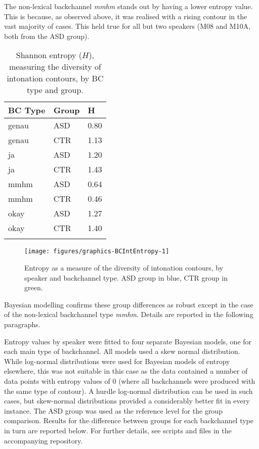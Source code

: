 The non-lexical backchannel \emph{mmhm} stands out by having a lower entropy value. This is because, as observed above, it was realised with a rising contour in the vast majority of cases. This held true for all but two speakers (M08 and M10A, both from the ASD group).



\begin{table}
		\caption{\label{tab:BCIntEntropyGroup}Shannon entropy (\(H\)), measuring the diversity of intonation contours, by BC type and group.}
		
		\begin{tabular}{lll}
			\lsptoprule
			BC Type & Group & H\\
			\midrule
			genau & ASD & 0.80\\
			genau & CTR & 1.13\\
			ja & ASD & 1.20\\
			ja & CTR & 1.43\\
			mmhm & ASD & 0.64\\
			mmhm & CTR & 0.46\\
			okay & ASD & 1.27\\
			okay & CTR & 1.40\\
			\lspbottomrule
		\end{tabular}

\end{table}



\begin{figure}

{\texttt{[image: figures/graphics-BCIntEntropy-1]}
	
}

\caption{Entropy as a measure of the diversity of intonation contours, by speaker and backchannel type. ASD group in blue, CTR group in green.}\label{fig:BCIntEntropy}
\end{figure}

Bayesian modelling confirms these group differences as robust except in the case of the non-lexical backchannel type \emph{mmhm}. Details are reported in the following paragraphs.

Entropy values by speaker were fitted to four separate Bayesian models, one for each main type of backchannel. All models used a skew normal distribution. While log-normal distributions were used for Bayesian models of entropy elsewhere, this was not suitable in this case as the data contained a number of data points with entropy values of 0 (where all backchannels were produced with the same type of contour). A hurdle log-normal distribution can be used in such cases, but skew-normal distributions provided a considerably better fit in every instance. The ASD group was used as the reference level for the group comparison. Results for the difference between groups for each backchannel type in turn are reported below. For further details, see scripts and files in the accompanying repository.

